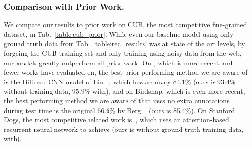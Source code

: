 \documentclass[runningheads]{llncs}
\begin{document}
\begin{SCtable}[][t]
{
}
{\caption{Comparison with prior work on CUB-200-2011~\cite{wahcub2002011}.
We only include methods which use no annotations at test time.
Here ``GT'' refers to using Ground Truth category labels in the training set of CUB, ``BBox'' indicates using bounding boxes, and ``Parts'' additionally uses part annotations.
}}
\label{table:cub_prior}
\end{SCtable}

\subsubsection{Comparison with Prior Work.}
We compare our results to prior work on CUB, the most competitive fine-grained dataset, in Tab.~\ref{table:cub_prior}.
While even our baseline model using only ground truth data from Tab.~\ref{table:rec_results} was at state of the art levels, by forgoing the CUB training set and only training using noisy data from the web, our models greatly outperform all prior work.
On \fgvc{}, which is more recent and fewer works have evaluated on, the best prior performing method we are aware of is the Bilinear CNN model of Lin \etal~\cite{lin2015bilinear}, which has accuracy 84.1\% (ours is 93.4\% without \fgvc{} training data, 95.9\% with), and on Birdsnap, which is even more recent, the best performing method we are aware of that uses no extra annotations during test time is the original 66.6\% by Berg \etal~\cite{bergbirdsnapcvpr2014} (ours is 85.4\%).
On Stanford Dogs, the most competitive related work is~\cite{sermanet2014attention}, which uses an attention-based recurrent neural network to achieve  (ours is  without ground truth training data,  with).
\end{document}

